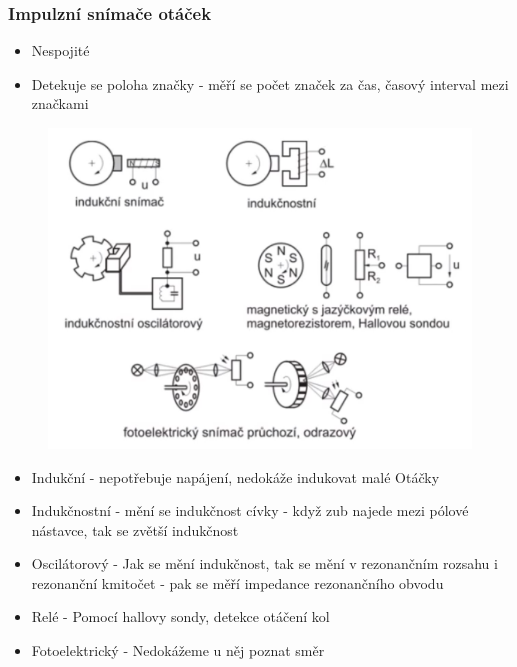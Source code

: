 \subsubsection*{Impulzní snímače otáček}
\begin{itemize}
    \item Nespojité
    \item Detekuje se poloha značky - měří se počet značek za čas, časový interval mezi značkami
\end{itemize}

\begin{figure}[h]
    \centering
    \includegraphics[scale = 0.50]{img/impulzRYCH.png}
\end{figure}

\begin{itemize}
    \item Indukční - nepotřebuje napájení, nedokáže indukovat malé Otáčky
    \item Indukčnostní - mění se indukčnost cívky - když zub najede mezi pólové nástavce, tak se zvětší indukčnost
    \item Oscilátorový - Jak se mění indukčnost, tak se mění v rezonančním rozsahu i rezonanční kmitočet - pak se měří impedance rezonančního obvodu
    \item Relé - Pomocí hallovy sondy, detekce otáčení kol
    \item Fotoelektrický - Nedokážeme u něj poznat směr
\end{itemize}

